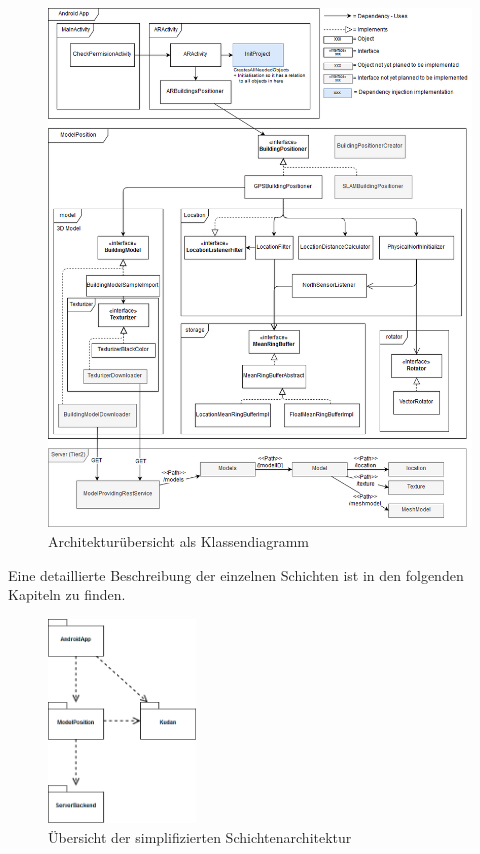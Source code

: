 \documentclass[a4paper]{scrreprt}
\begin{document}
\begin{figure}[h!]
	\includegraphics[keepaspectratio, width=\textwidth]{ArchitekturOverview.png}
	\caption{Architekturübersicht als Klassendiagramm}
\end{figure}

Eine detaillierte Beschreibung der einzelnen Schichten ist in den folgenden Kapiteln zu finden.

\begin{figure}[h!]
  \center
  \includegraphics[width=0.35\textwidth]{SchichtenDiagramm.png}
  \caption{Übersicht der simplifizierten Schichtenarchitektur}
\end{figure}
\end{document}
